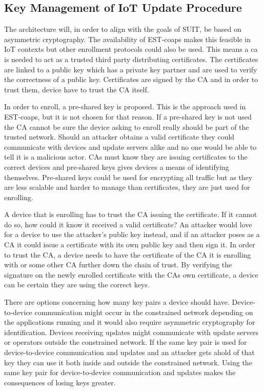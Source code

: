 \documentclass[0-thesis.tex]{subfiles}
\begin{document}
\subsection{Key Management of IoT Update Procedure}
\label{ssec:key-management}
The architecture will, in order to align with the goals of SUIT, be based on asymmetric
cryptography. The availability of EST-coaps makes this feasible in IoT contexts but other
enrollment protocols could also be used. This means a \gls{ca} is needed to act as a
trusted third party distributing certificates. The certificates are linked to a public key
which has a private key partner and are used to verify the correctness of a public key.
Certificates are signed by the CA and in order to trust them, device have to trust the CA
itself.

In order to enroll, a pre-shared key is proposed. This is the approach used in EST-coaps,
but it is not chosen for that reason. If a pre-shared key is not used the CA cannot be
sure the device asking to enroll really should be part of the trusted network. Should an
attacker obtains a valid certificate they could communicate with devices and update
servers alike and no one would be able to tell it is a malicious actor. CAs must know they
are issuing certificates to the correct devices and pre-shared keys gives devices a means
of identifying themselves. Pre-shared keys could be used for encrypting all traffic but as
they are less scalable and harder to manage than certificates, they are just used for
enrolling.

A device that is enrolling has to trust the CA issuing the certificate. If it cannot do
so, how could it know it received a valid certificate? An attacker would love for a device
to use the attacker's public key instead, and if an attacker poses as a CA it could issue
a certificate with its own public key and then sign it. In order to trust the CA, a device
needs to have the certificate of the CA it is enrolling with or some other CA further down
the chain of trust. By verifying the signature on the newly enrolled certificate with the
CAs own certificate, a device can be certain they are using the correct keys.

There are options concerning how many key pairs a device should have. Device-to-device
communication might occur in the constrained network depending on the applications running
and it would also require asymmetric cryptography for identification. Devices receiving
updates might communicate with update servers or operators outside the constrained
network. If the same key pair is used for device-to-device communication and updates and
an attacker gets ahold of that key they can use it both inside and outside the constrained
network. Using the same key pair for device-to-device communication and updates makes the
consequences of losing keys greater. 
\end{document}
